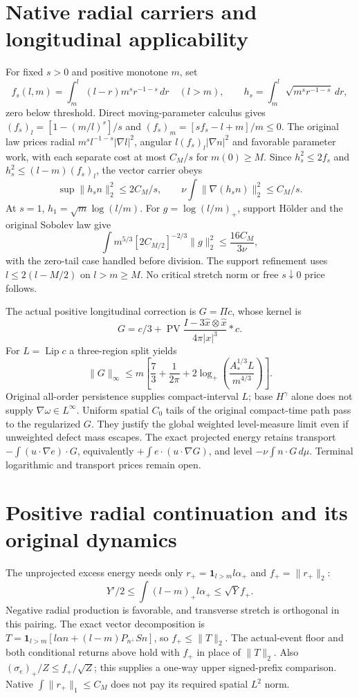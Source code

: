 \documentclass[11pt]{article}
\begin{document}
\section{Native radial carriers and longitudinal applicability}
For fixed $s>0$ and positive monotone $m$, set
\[
 f_s(l,m)=\int_m^l(l-r)m^sr^{-1-s}\,dr\quad(l>m),
 \qquad h_s=\int_m^l\sqrt{m^sr^{-1-s}}\,dr,
\]
zero below threshold. Direct moving-parameter calculus gives
$(f_s)_l=[1-(m/l)^s]/s$ and $(f_s)_m=[sf_s-l+m]/m\le0$.
The original law prices radial $m^sl^{-1-s}|\nabla l|^2$,
angular $l(f_s)_l|\nabla n|^2$ and favorable parameter work,
with each separate cost at most $C_M/s$ for $m(0)\ge M$.
Since $h_s^2\le2f_s$ and $h_s^2\le(l-m)(f_s)_l$, the vector carrier obeys
\[
 \sup\|h_sn\|_2^2\le2C_M/s,\qquad
 \nu\int\|\nabla(h_sn)\|_2^2\le C_M/s.
\]
At $s=1$, $h_1=\sqrt m\log(l/m)$. For $g=\log(l/m)_+$,
support H\"older and the original Sobolev law give
\[
 \int m^{5/3}[2C_{M/2}]^{-2/3}\|g\|_2^2
 \le\frac{16C_M}{3\nu},
\]
with the zero-tail case handled before division. The support refinement uses
$l\le2(l-M/2)$ on $l>m\ge M$. No critical stretch norm or free $s\downarrow0$
price follows.

The actual positive longitudinal correction is $G=\Pi c$, whose kernel is
\[
 G=c/3+\operatorname{PV}\frac{I-3\widehat x\otimes\widehat x}
                                      {4\pi|x|^3}*c.
\]
For $L=\operatorname{Lip}c$ a three-region split yields
\[
 \|G\|_\infty\le m\left[\frac73+\frac1{2\pi}
       +2\log_+\!\left(\frac{A_*^{1/3}L}{m^{4/3}}\right)\right].
\]
Original all-order persistence supplies compact-interval $L$; base
$H^\gamma$ alone does not supply $\nabla\omega\in L^\infty$.
Uniform spatial $C_0$ tails of the original compact-time path pass to the
regularized $G$. They justify the global weighted level-measure limit
even if unweighted defect mass escapes. The exact projected energy retains
transport $-\int(u\cdot\nabla e)\cdot G$, equivalently
$+\int e\cdot(u\cdot\nabla G)$, and level $-\nu\int n\cdot G\,d\mu$.
Terminal logarithmic and transport prices remain open.

\section{Positive radial continuation and its original dynamics}
The unprojected excess energy needs only
$r_+=\mathbf1_{l>m}l\alpha_+$ and $f_+=\|r_+\|_2$:
\[
 Y'/2\le\int(l-m)_+l\alpha_+\le\sqrt Y f_+.
\]
Negative radial production is favorable, and transverse stretch is
orthogonal in this pairing. The exact vector decomposition is
$T=\mathbf1_{l>m}[l\alpha n+(l-m)P_{n^\perp}Sn]$, so
$f_+\le\|T\|_2$. The actual-event floor and both conditional returns
above hold with $f_+$ in place of $\|T\|_2$. Also
$(\sigma_e)_+/Z\le f_+/\sqrt Z$; this supplies a one-way upper
signed-prefix comparison. Native $\int\|r_+\|_1\le C_M$ does not
pay its required spatial $L^2$ norm.
\end{document}
